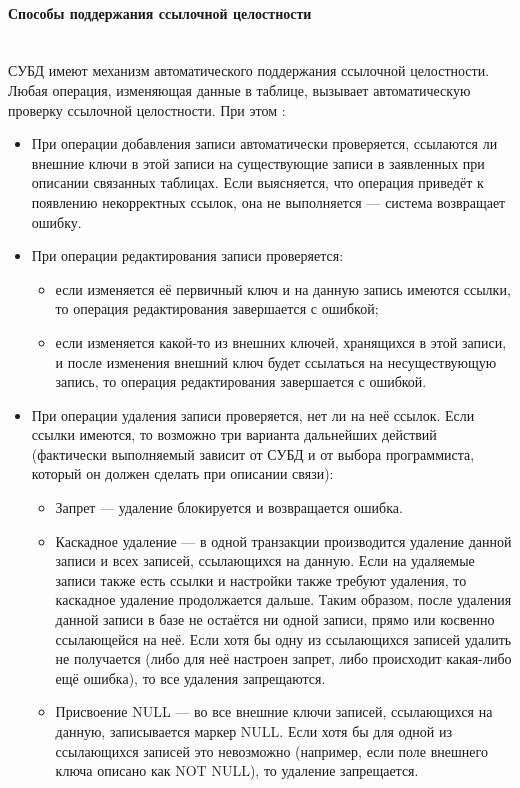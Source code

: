 \paragraph{Способы поддержания ссылочной целостности} ~\\
СУБД имеют механизм автоматического поддержания ссылочной целостности. Любая операция, изменяющая данные в таблице, вызывает автоматическую проверку ссылочной целостности. При этом \autocite{WikiLink}:
\begin{itemize}
    \item При операции добавления записи автоматически проверяется, ссылаются ли внешние ключи в этой записи на существующие записи в заявленных при описании связанных таблицах. Если выясняется, что операция приведёт к появлению некорректных ссылок, она не выполняется — система возвращает ошибку.
    \item При операции редактирования записи проверяется:
    \begin{itemize}
        \item если изменяется её первичный ключ и на данную запись имеются ссылки, то операция редактирования завершается с ошибкой;
        \item если изменяется какой-то из внешних ключей, хранящихся в этой записи, и после изменения внешний ключ будет ссылаться на несуществующую запись, то операция редактирования завершается с ошибкой.
    \end{itemize}
    \item При операции удаления записи проверяется, нет ли на неё ссылок. Если ссылки имеются, то возможно три варианта дальнейших действий (фактически выполняемый зависит от СУБД и от выбора программиста, который он должен сделать при описании связи):
    \begin{itemize}
        \item Запрет — удаление блокируется и возвращается ошибка.
        \item Каскадное удаление — в одной транзакции производится удаление данной записи и всех записей, ссылающихся на данную. Если на удаляемые записи также есть ссылки и настройки также требуют удаления, то каскадное удаление продолжается дальше. Таким образом, после удаления данной записи в базе не остаётся ни одной записи, прямо или косвенно ссылающейся на неё. Если хотя бы одну из ссылающихся записей удалить не получается (либо для неё настроен запрет, либо происходит какая-либо ещё ошибка), то все удаления запрещаются.
        \item Присвоение NULL — во все внешние ключи записей, ссылающихся на данную, записывается маркер NULL. Если хотя бы для одной из ссылающихся записей это невозможно (например, если поле внешнего ключа описано как NOT NULL), то удаление запрещается.
    \end{itemize}
\end{itemize}

